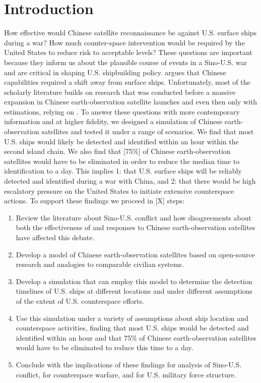 \documentclass[12pt]{article}
\begin{document}
\section{Introduction}
How effective would Chinese satellite reconnaissance be against U.S. surface ships during a war? How much counter-space intervention would be required by the United States to reduce risk to acceptable levels? These questions are important because they inform us about the plausible course of events in a Sino-U.S. war and are critical in shaping U.S. shipbuilding policy. \cite{montgomeryContestedPrimacyWestern2014} argues that Chinese capabilities required a shift away from surface ships. Unfortunately, most of the scholarly literature builds on research that was conducted before a massive expansion in Chinese earth-observation satellite launches and even then only with estimations, relying on \cite{heginbothamUSChinaMilitaryScorecard2015}. To answer these questions with more contemporary information and at higher fidelity, we designed a simulation of Chinese earth-observation satellites and tested it under a range of scenarios. We find that most U.S. ships would likely be detected and identified within an hour within the second island chain. We also find that [75\%] of Chinese earth-observation satellites would have to be eliminated in order to reduce the median time to identification to a day. This implies 1: that U.S. surface ships will be reliably detected and identified during a war with China, and 2: that there would be high escalatory pressure on the United States to initiate extensive counterspace actions. To support these findings we proceed in [X] steps:
\begin{enumerate}[label=\arabic*.]
    \item Review the literature about Sino-U.S. conflict and how disagreements about both the effectiveness of and responses to Chinese earth-observation satellites have affected this debate.
    \item Develop a model of Chinese earth-observation satellites based on open-source research and analogies to comparable civilian systems.
    \item Develop a simulation that can employ this model to determine the detection timelines of U.S. ships at different locations and under different assumptions of the extent of U.S. counterspace efforts.
    \item Use this simulation under a variety of assumptions about ship location and counterspace activities, finding that most U.S. ships would be detected and identified within an hour and that 75\% of Chinese earth-observation satellites would have to be eliminated to reduce this time to a day.
    \item Conclude with the implications of these findings for analysis of Sino-U.S. conflict, for counterspace warfare, and for U.S. military force structure.
\end{enumerate}
\end{document}
